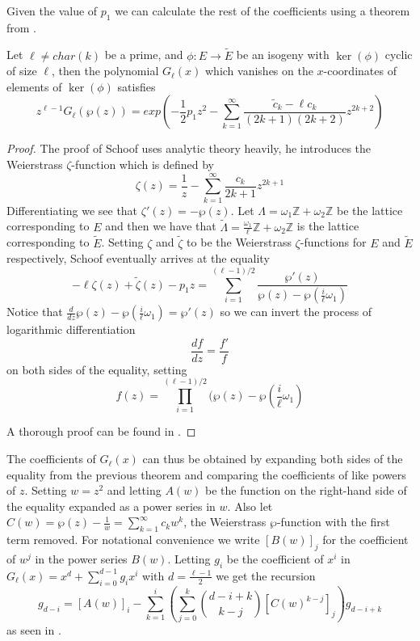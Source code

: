 Given the value of $p_1$ we can calculate the rest of the coefficients using a theorem from \cite{Schoof}.
\begin{thm}
 Let $\ell \neq char(k)$ be a prime, and $\phi: E \rightarrow \widetilde{E}$ be an isogeny with $\ker(\phi)$
cyclic of size $\ell$, then the polynomial $G_\ell(x)$ which vanishes on the $x$-coordinates of
elements of $\ker(\phi)$ satisfies
$$ z^{\ell-1}G_\ell(\wp(z)) = exp(-\frac{1}{2}p_1 z^2 - \sum_{k=1}^\infty \frac{\widetilde{c}_k-\ell c_k}{(2k+1)(2k+2)}z^{2k+2})$$
\end{thm}
\begin{proof}
 The proof of Schoof uses analytic theory heavily, he introduces the Weierstrass $\zeta$-function
which is defined by
$$\zeta(z) = \frac{1}{z} - \sum_{k=1}^\infty \frac{c_k}{2k+1} z^{2k+1} $$
Differentiating we see that $\zeta'(z) = - \wp(z)$. Let $\Lambda = \omega_1 \mathbb{Z}+\omega_2\mathbb{Z}$
be the lattice corresponding to $E$ and then we have that
$\widetilde{\Lambda} = \frac{\omega_1}{\ell}\mathbb{Z}+\omega_2\mathbb{Z}$ is the lattice corresponding
to $\widetilde{E}$. Setting $\zeta$ and $\widetilde{\zeta}$ to be the Weierstrass $\zeta$-functions for
$E$ and $\widetilde{E}$ respectively, Schoof eventually arrives at the equality
$$-\ell \zeta(z)+\widetilde{\zeta}(z)-p_1 z = \sum_{i=1}^{(\ell-1)/2} \frac{\wp'(z)}{\wp(z)-\wp(\frac{i}{\ell}\omega_1)} $$
Notice that $\frac{d}{dz} \wp(z) - \wp(\frac{i}{\ell}\omega_1) = \wp'(z)$ so we can invert the process
of logarithmic differentiation
$$ \frac{df}{dz} = \frac{f'}{f}$$
on both sides of the equality, setting $$f(z) = \prod_{i=1}^{(\ell-1)/2}(\wp(z)-\wp(\frac{i}{\ell}\omega_1)$$

A thorough proof can be found in \cite{Schoof}.
\end{proof}

The coefficients of $G_\ell(x)$ can thus be obtained by expanding both sides of
the equality from the previous theorem and comparing the coefficients of like powers of $z$.
Setting $w=z^2$ and letting $A(w)$ be the function on the right-hand side of the equality
expanded as a power series in $w$. Also let $C(w) = \wp(z) - \frac{1}{w} = \sum_{k=1}^\infty c_k w^k$,
the Weierstrass $\wp$-function with the first term removed. For notational convenience we
write $[B(w)]_j$ for the coefficient of $w^j$ in the power series $B(w)$. Letting $g_i$ be the
coefficient of $x^i$ in $G_\ell(x) = x^d + \sum_{i=0}^{d-1} g_i x^i$ with $d = \frac{\ell-1}{2}$ 
we get the recursion
$$g_{d-i} = [A(w)]_i - \sum_{k=1}^i \left( \sum_{j=0}^k \binom{d-i+k}{k-j} [C(w)^{k-j}]_j \right) g_{d-i+k} $$
as seen in \cite{Blake}.

